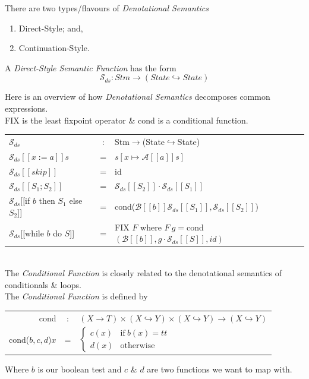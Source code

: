 \documentclass[11pt,a4paper]{article}
\begin{document}
There are two types/flavours of \textit{Denotational Semantics}
\begin{enumerate}[label=\roman*)]
	\item Direct-Style; and,
	\item Continuation-Style.
\end{enumerate} 

A \textit{Direct-Style Semantic Function} has the form
$$\mathcal{S}_{ds}:Stm\to(State\hookrightarrow State)$$

Here is an overview of how \textit{Denotational Semantics} decomposes common expressions.\\
FIX is the least fixpoint operator \& cond is a conditional function.\\
\begin{tabular}{lcl}
$\mathcal{S}_{ds}$&:&Stm$\to$(State$\hookrightarrow$State)\\
$\mathcal{S}_{ds}[[x:=a]]s$&=&$s[x\mapsto\mathcal{A}[[a]]s]$\\
$\mathcal{S}_{ds}[[skip]]$&=&id\\
$\mathcal{S}_{ds}[[S_1;S_2]]$&=&$\mathcal{S}_{ds}[[S_2]]\cdot\mathcal{S}_{ds}[[S_1]]$\\
$\mathcal{S}_{ds}[[$if $b$ then $S_1$ else $S_2$]]&=&cond($\mathcal{B}[[b]]\mathcal{S}_{ds}[[S_1]],\mathcal{S}_{ds}[[S_2]]$)\\
$\mathcal{S}_{ds}$[[while $b$ do $S$]]&=& FIX $F$ where $F\ g=$cond$(\mathcal{B}[[b]],g\cdot\mathcal{S}_{ds}[[S]],id)$
\end{tabular}
\\

The \textit{Conditional Function} is closely related to the denotational semantics of conditionals \& loops.\\
The \textit{Conditional Function} is defined by\\
\begin{tabular}{rcl}
cond&:&$(X\to T)\times(X\hookrightarrow Y)\times(X\hookrightarrow Y)\to(X\hookrightarrow Y)$\\
cond($b,c,d$)$x$&=&$\begin{cases}c(x)&\mathrm{if\ }b(x)=tt\\d(x)&\mathrm{otherwise}\end{cases}$
\end{tabular}
Where $b$ is our boolean test and $c$ \& $d$ are two functions we want to map with.\\
\end{document}
